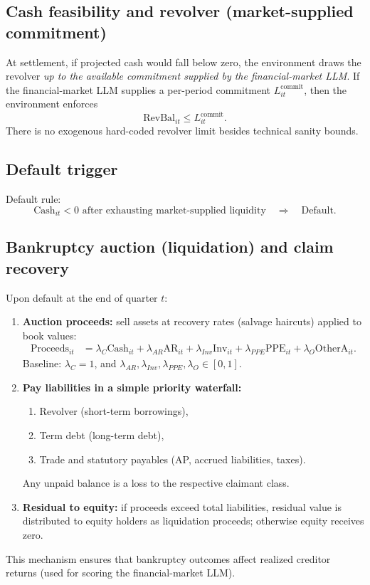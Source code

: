 \documentclass[11pt]{article}
\begin{document}
\subsection{Cash feasibility and revolver (market-supplied commitment)}
At settlement, if projected cash would fall below zero, the environment draws the revolver \emph{up to the available commitment supplied by the financial-market LLM}.
If the financial-market LLM supplies a per-period commitment $L^{\text{commit}}_{it}$, then the environment enforces
\[
\text{RevBal}_{it}\le L^{\text{commit}}_{it}.
\]
There is no exogenous hard-coded revolver limit besides technical sanity bounds.

\subsection{Default trigger}
Default rule:
\[
\text{Cash}_{it}<0 \text{ after exhausting market-supplied liquidity} \quad \Rightarrow\quad \text{Default}.
\]

\subsection{Bankruptcy auction (liquidation) and claim recovery}
Upon default at the end of quarter $t$:
\begin{enumerate}[leftmargin=*]
    \item \textbf{Auction proceeds:} sell assets at recovery rates (salvage haircuts) applied to book values:
    \begin{align}
    \text{Proceeds}_{it} &= \lambda_C \text{Cash}_{it} + \lambda_{AR}\text{AR}_{it} + \lambda_{Inv}\text{Inv}_{it} + \lambda_{PPE}\text{PPE}_{it} + \lambda_{O}\text{OtherA}_{it}.
    \end{align}
    Baseline: $\lambda_C=1$, and $\lambda_{AR},\lambda_{Inv},\lambda_{PPE},\lambda_O\in[0,1]$.
    \item \textbf{Pay liabilities in a simple priority waterfall:}
    \begin{enumerate}[leftmargin=*]
        \item Revolver (short-term borrowings),
        \item Term debt (long-term debt),
        \item Trade and statutory payables (AP, accrued liabilities, taxes).
    \end{enumerate}
    Any unpaid balance is a loss to the respective claimant class.
    \item \textbf{Residual to equity:} if proceeds exceed total liabilities, residual value is distributed to equity holders as liquidation proceeds; otherwise equity receives zero.
\end{enumerate}
This mechanism ensures that bankruptcy outcomes affect realized creditor returns (used for scoring the financial-market LLM).
\end{document}
